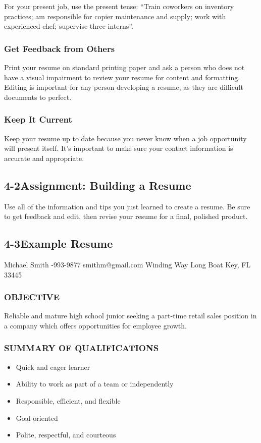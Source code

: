 For your present job, use the present tense: ``Train coworkers on inventory practices; am responsible for copier maintenance and supply; work with experienced chef; supervise three interns''.

\subsubsection*{Get Feedback from Others}

Print your resume on standard printing paper and ask a person who does not have a visual impairment to review your resume for content and formatting. Editing is important for any person developing a resume, as they are difficult documents to perfect.

\subsubsection*{Keep It Current}

Keep your resume up to date because you never know when a job opportunity will present itself. It's important to make sure your contact information is accurate and appropriate.

\pagebreak \subsection*{4-2\quad Assignment: Building a Resume}
Use all of the information and tips you just learned to create a resume. Be sure to get feedback and edit, then revise your resume for a final, polished product.

\pagebreak \subsection*{4-3\quad Example Resume}

Michael Smith
-993-9877
\break smithm@gmail.com
 Winding Way
\break Long Boat Key, FL 33445

\subsubsection*{OBJECTIVE}
\break Reliable and mature high school junior seeking a part-time retail sales position in a company which offers opportunities for employee growth.

\subsubsection*{SUMMARY OF QUALIFICATIONS}
\begin{itemize}
	\item Quick and eager learner
	\item Ability to work as part of a team or independently
	\item Responsible, efficient, and flexible
	\item Goal-oriented
	\item Polite, respectful, and courteous
\end{itemize}
